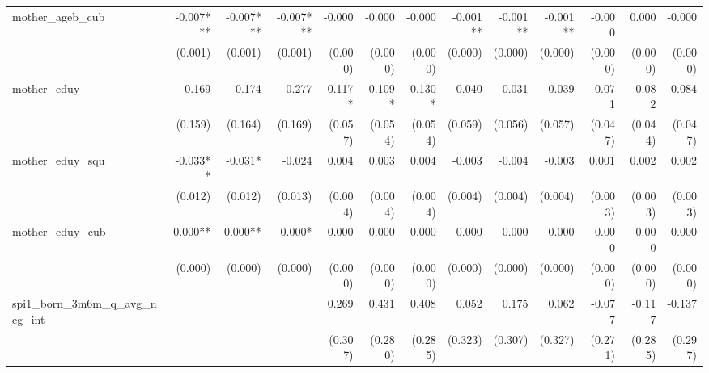 \begin{tabular}{lrrrrrrrrrrrr}
mother\_ageb\_cub                           &    -0.007*** &    -0.007*** &    -0.007*** &       -0.000 &       -0.000 &       -0.000 &     -0.001** &     -0.001** &     -0.001** &       -0.000 &        0.000 &       -0.000 \\ 
                                            &      (0.001) &      (0.001) &      (0.001) &      (0.000) &      (0.000) &      (0.000) &      (0.000) &      (0.000) &      (0.000) &      (0.000) &      (0.000) &      (0.000) \\ 
mother\_eduy                                &       -0.169 &       -0.174 &       -0.277 &      -0.117* &      -0.109* &      -0.130* &       -0.040 &       -0.031 &       -0.039 &       -0.071 &       -0.082 &       -0.084 \\ 
                                            &      (0.159) &      (0.164) &      (0.169) &      (0.057) &      (0.054) &      (0.054) &      (0.059) &      (0.056) &      (0.057) &      (0.047) &      (0.044) &      (0.047) \\ 
mother\_eduy\_squ                           &     -0.033** &      -0.031* &       -0.024 &        0.004 &        0.003 &        0.004 &       -0.003 &       -0.004 &       -0.003 &        0.001 &        0.002 &        0.002 \\ 
                                            &      (0.012) &      (0.012) &      (0.013) &      (0.004) &      (0.004) &      (0.004) &      (0.004) &      (0.004) &      (0.004) &      (0.003) &      (0.003) &      (0.003) \\ 
mother\_eduy\_cub                           &      0.000** &      0.000** &       0.000* &       -0.000 &       -0.000 &       -0.000 &        0.000 &        0.000 &        0.000 &       -0.000 &       -0.000 &       -0.000 \\ 
                                            &      (0.000) &      (0.000) &      (0.000) &      (0.000) &      (0.000) &      (0.000) &      (0.000) &      (0.000) &      (0.000) &      (0.000) &      (0.000) &      (0.000) \\ 
spi1\_born\_3m6m\_q\_avg\_neg\_int          &              &              &              &        0.269 &        0.431 &        0.408 &        0.052 &        0.175 &        0.062 &       -0.077 &       -0.117 &       -0.137 \\ 
                                            &              &              &              &      (0.307) &      (0.280) &      (0.285) &      (0.323) &      (0.307) &      (0.327) &      (0.271) &      (0.285) &      (0.297) \\ 

\end{tabular}
